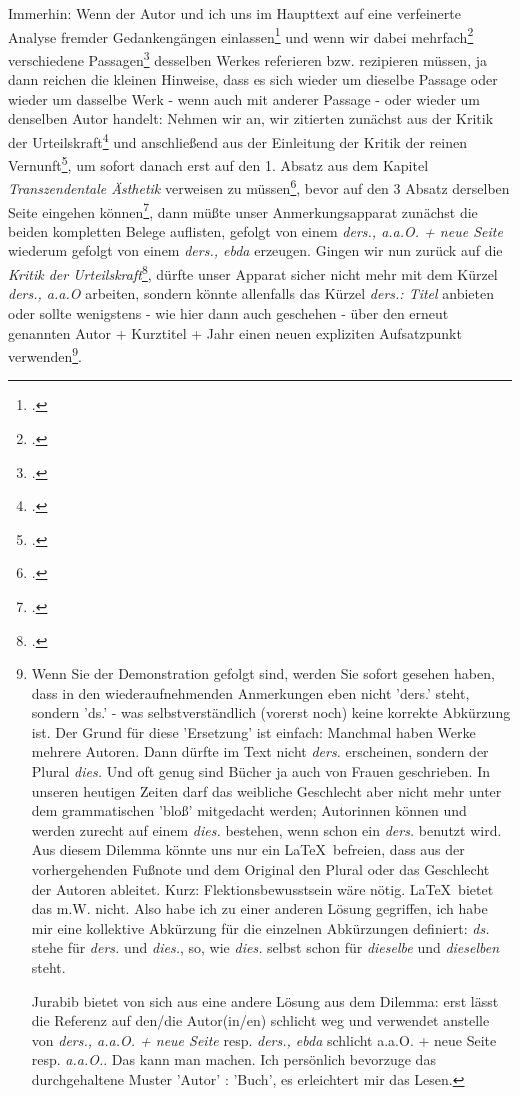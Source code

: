 Immerhin: Wenn der Autor und ich uns im Haupttext auf eine verfeinerte Analyse
fremder Gedankengängen einlassen\footcite[vgl. etwa][32]{Allen2001a} und wenn
wir dabei mehrfach\footcite[vgl.][139]{Allen2001a} verschiedene
Passagen\footcite[vgl.][139]{Allen2001a} desselben Werkes referieren bzw.
rezipieren müssen, ja dann reichen die kleinen Hinweise, dass es sich wieder um
dieselbe Passage oder wieder um dasselbe Werk - wenn auch mit anderer Passage -
oder wieder um denselben Autor handelt: Nehmen wir an, wir zitierten zunächst aus
der Kritik der Urteilskraft\footcite[vgl.][9]{KantKdU1974} und anschließend aus
der Einleitung der Kritik der reinen Vernunft\footcite[vgl.][45]{KantKdV1974},
um sofort danach erst auf den 1. Absatz aus dem Kapitel \emph{Transzendentale
Ästhetik} verweisen zu müssen\footcite[vgl.][69]{KantKdV1974}, bevor auf den 3
Absatz derselben Seite eingehen können\footcite[vgl.][69]{KantKdV1974}, dann
müßte unser Anmerkungsapparat zunächst die beiden kompletten Belege auflisten,
gefolgt von einem \emph{ders., a.a.O. + neue Seite} wiederum gefolgt von einem
\emph{ders., ebda} erzeugen. Gingen wir nun zurück auf die \emph{Kritik der
Urteilskraft}\footcite[vgl.][9]{KantKdU1974}, dürfte unser Apparat sicher nicht
mehr mit dem Kürzel \emph{ders., a.a.O} arbeiten, sondern könnte allenfalls das
Kürzel \emph{ders.: Titel} anbieten oder sollte wenigstens - wie hier dann auch
geschehen - über den erneut genannten Autor + Kurztitel + Jahr einen neuen
expliziten Aufsatzpunkt verwenden\footnote{Wenn Sie der Demonstration gefolgt
sind, werden Sie sofort gesehen haben, dass in den wiederaufnehmenden
Anmerkungen eben nicht 'ders.' steht, sondern 'ds.' - was selbstverständlich
(vorerst noch) keine korrekte Abkürzung ist. Der Grund für diese 'Ersetzung' ist
einfach: Manchmal haben Werke mehrere Autoren. Dann dürfte im Text nicht
{\itshape ders.} erscheinen, sondern der Plural {\itshape dies.} Und oft genug
sind Bücher ja auch von Frauen geschrieben. In unseren heutigen Zeiten darf das
weibliche Geschlecht aber nicht mehr unter dem grammatischen 'bloß' mitgedacht
werden; Autorinnen können und werden zurecht auf einem {\itshape dies.}
bestehen, wenn schon ein {\itshape ders.} benutzt wird. Aus diesem Dilemma
könnte uns nur ein \LaTeX\ befreien, dass aus der vorhergehenden Fußnote und dem
Original den Plural oder das Geschlecht der Autoren ableitet. Kurz:
Flektionsbewusstsein wäre nötig. \LaTeX\ bietet das m.W. nicht. Also habe ich zu
einer anderen Lösung gegriffen, ich habe mir eine kollektive Abkürzung für die
einzelnen Abkürzungen definiert: {\itshape ds.} stehe für {\itshape ders.} und
{\itshape dies.}, so, wie {\itshape dies.} selbst schon für {\itshape dieselbe}
und {\itshape dieselben} steht.

Jurabib bietet von sich aus eine andere Lösung aus dem Dilemma: erst lässt die
Referenz auf den/die Autor(in/en) schlicht weg und verwendet anstelle von
{\itshape ders., a.a.O. + neue Seite} resp. {\itshape ders., ebda} schlicht
{a.a.O. + neue Seite} resp. {\itshape a.a.O.}. Das kann man machen. Ich
persönlich bevorzuge das durchgehaltene Muster 'Autor' : 'Buch', es erleichtert
mir das Lesen.}.

